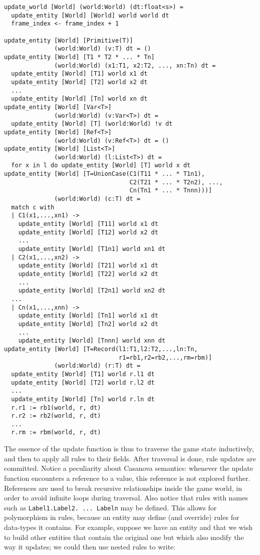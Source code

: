 \begin{lstlisting}
update_world [World] (world:World) (dt:float<s>) = 
  update_entity [World] [World] world world dt
  frame_index <- frame_index + 1

update_entity [World] [Primitive(T)] 
              (world:World) (v:T) dt = ()
update_entity [World] [T1 * T2 * ... * Tn] 
              (world:World) (x1:T1, x2:T2, ..., xn:Tn) dt =
  update_entity [World] [T1] world x1 dt 
  update_entity [World] [T2] world x2 dt
  ...
  update_entity [World] [Tn] world xn dt
update_entity [World] [Var<T>] 
              (world:World) (v:Var<T>) dt = 
  update_entity [World] [T] (world:World) !v dt
update_entity [World] [Ref<T>] 
              (world:World) (v:Ref<T>) dt = ()
update_entity [World] [List<T>] 
              (world:World) (l:List<T>) dt =
  for x in l do update_entity [World] [T] world x dt
update_entity [World] [T=UnionCase(C1(T11 * ... * T1n1), 
                                   C2(T21 * ... * T2n2), ..., 
                                   Cn(Tn1 * ... * Tnnn)))] 
              (world:World) (c:T) dt =
  match c with
  | C1(x1,...,xn1) ->
    update_entity [World] [T11] world x1 dt
    update_entity [World] [T12] world x2 dt
    ...
    update_entity [World] [T1n1] world xn1 dt
  | C2(x1,...,xn2) ->
    update_entity [World] [T21] world x1 dt
    update_entity [World] [T22] world x2 dt
    ...
    update_entity [World] [T2n1] world xn2 dt
  ...
  | Cn(x1,...,xnn) ->
    update_entity [World] [Tn1] world x1 dt
    update_entity [World] [Tn2] world x2 dt
    ...
    update_entity [World] [Tnnn] world xnn dt
update_entity [World] [T=Record(l1:T1,l2:T2,...,ln:Tn,
                                r1=rb1,r2=rb2,...,rm=rbm)] 
              (world:World) (r:T) dt =
  update_entity [World] [T1] world r.l1 dt
  update_entity [World] [T2] world r.l2 dt
  ...
  update_entity [World] [Tn] world r.ln dt
  r.r1 := rb1(world, r, dt)
  r.r2 := rb2(world, r, dt)
  ...
  r.rm := rbm(world, r, dt)
\end{lstlisting}

The essence of the update function is thus to traverse the game state inductively, and then to apply all rules to their fields. After traversal is done, rule updates are committed. Notice a peculiarity about Casanova semantics: whenever the update function encounters a reference to a value, this reference is not explored further. References are used to break recursive relationships inside the game world, in order to avoid infinite loops during traversal. Also notice that rules with names such as \texttt{Label1.Label2. ... Labeln} may be defined. This allows for polymorphism in rules, because an entity may define (and override) rules for data-types it contains. For example, suppose we have an entity and that we wish to build other entities that contain the original one but which also modify the way it updates; we could then use nested rules to write:

